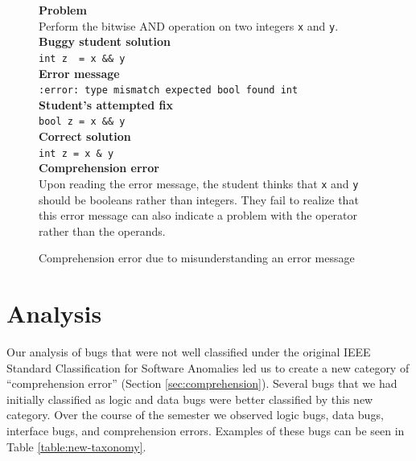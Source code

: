 \documentclass{sig-alternate}
\begin{document}
\begin{figure}
\begin{framed}
\setlength{\parindent}{0cm}
\textbf{Problem} \\
Perform the bitwise AND operation on two integers \texttt{x} and \texttt{y}.\\

\textbf{Buggy student solution} \\
\verb|int z  = x && y|\\

\textbf{Error message}\\
\texttt{:error: type mismatch expected bool found int}\\

\textbf{Student's attempted fix}\\
\verb|bool z = x && y|\\

\textbf{Correct solution}\\
\verb|int z = x & y|\\

\textbf{Comprehension error}\\
Upon reading the error message, the student thinks that \texttt{x} and \texttt{y} should be booleans rather than integers. They fail to realize that this error message can also indicate a problem with the operator rather than the operands.
\end{framed}
\vspace{-0.1in}
\caption{Comprehension error due to misunderstanding an error message}
\label{fig:comp3}
\end{figure}


\section{Analysis}
\label{sec:analysis}

Our analysis of bugs that were not well classified under the original IEEE Standard Classification for Software Anomalies led us to create a new category of ``comprehension error'' (Section \ref{sec:comprehension}). Several bugs that we had initially classified as logic and data bugs were better classified by this new category. Over the course of the semester we observed \numlogic logic bugs, \numdata data bugs, \numinterface interface bugs, and \numcomp comprehension errors. Examples of these bugs can be seen in Table \ref{table:new-taxonomy}.\\
\end{document}
